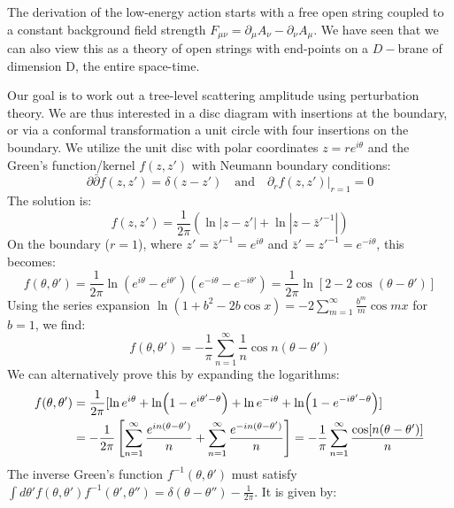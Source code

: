 \begin{tcolorbox}[breakable]
			The derivation of the low-energy action starts with a free open string coupled to a constant background field strength $F_{\mu\nu} = \partial_\mu A_\nu - \partial_\nu A_\mu$. We have seen that we can also view this as a theory of open strings with end-points on a $D-$brane of dimension D, the entire	space-time. 
			
			Our goal is to work out a tree-level scattering amplitude using perturbation theory. We	are thus interested in a disc diagram with insertions at the boundary, or via a conformal	transformation a unit circle with four insertions on the boundary. We utilize the unit disc with polar coordinates $z = re^{i\theta}$ and the Green's function/kernel $f(z, z')$ with Neumann boundary conditions:
			\begin{equation}
				\partial \bar{\partial} f(z, z') = \delta(z - z') \quad \text{and} \quad \partial_r f(z, z') \big|_{r=1} = 0 
			\end{equation}
			The solution is:
			\begin{equation}
				f(z, z') = \frac{1}{2\pi} (\ln |z - z'| + \ln |z - \bar{z}'^{-1}|) 
			\end{equation}
			On the boundary ($r=1$), where $z' = \bar{z}'^{-1} = e^{i\theta}$ and $\bar{z}' = z'^{-1} = e^{-i\theta}$, this becomes:
			\begin{equation}
				f(\theta, \theta') = \frac{1}{2\pi} \ln (e^{i\theta} - e^{i\theta'})(e^{-i\theta} - e^{-i\theta'}) = \frac{1}{2\pi} \ln [2 - 2 \cos(\theta - \theta')] 
			\end{equation}
			Using the series expansion $\ln(1 + b^2 - 2b \cos x) = -2 \sum_{m=1}^\infty \frac{b^m}{m} \cos mx$ for $b=1$, we find:
			\begin{equation}
				f(\theta, \theta') = -\frac{1}{\pi} \sum_{n=1}^\infty \frac{1}{n} \cos n(\theta - \theta')\label{8.511} 
			\end{equation}
			We can alternatively prove this by expanding the logarithms:
			\begin{align}
				f(\theta, \theta') &= \frac{1}{2\pi} [ \ln e^{i\theta} + \ln(1 - e^{i\theta' - \theta}) + \ln e^{-i\theta} + \ln(1 - e^{-i\theta' - \theta}) ] \notag\\
				&= -\frac{1}{2\pi} \left[ \sum_{n=1}^\infty \frac{e^{in(\theta - \theta')}}{n} + \sum_{n=1}^\infty \frac{e^{-in(\theta - \theta')}}{n} \right] = -\frac{1}{\pi} \sum_{n=1}^\infty \frac{\cos [n(\theta - \theta')]}{n} 
			\end{align}
			The inverse Green's function $f^{-1}(\theta, \theta')$ must satisfy $\int d\theta' f(\theta, \theta') f^{-1}(\theta', \theta'') = \delta(\theta - \theta'') - \frac{1}{2\pi}$. It is given by:

\end{tcolorbox}
